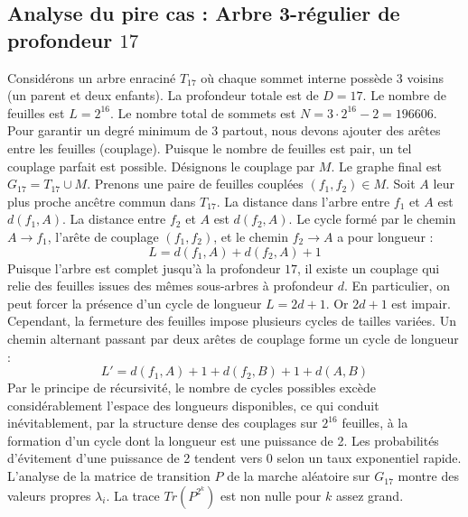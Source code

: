 \documentclass[11pt,a4paper]{article}
\begin{document}
\subsection{Analyse du pire cas : Arbre 3-régulier de profondeur $17$}
Considérons un arbre enraciné $T_17$ où chaque sommet interne possède 3 voisins (un parent et deux enfants).
La profondeur totale est de $D = 17$.
Le nombre de feuilles est $L = 2^{16}$.
Le nombre total de sommets est $N = 3 \cdot 2^{16} - 2 = 196606$.
Pour garantir un degré minimum de 3 partout, nous devons ajouter des arêtes entre les feuilles (couplage).
Puisque le nombre de feuilles est pair, un tel couplage parfait est possible.
Désignons le couplage par $M$. Le graphe final est $G_17 = T_17 \cup M$.
Prenons une paire de feuilles couplées $(f_1, f_2) \in M$.
Soit $A$ leur plus proche ancêtre commun dans $T_17$.
La distance dans l'arbre entre $f_1$ et $A$ est $d(f_1, A)$.
La distance entre $f_2$ et $A$ est $d(f_2, A)$.
Le cycle formé par le chemin $A \to f_1$, l'arête de couplage $(f_1, f_2)$, et le chemin $f_2 \to A$ a pour longueur :
$$ L = d(f_1, A) + d(f_2, A) + 1 $$
Puisque l'arbre est complet jusqu'à la profondeur $17$, il existe un couplage qui relie des feuilles issues des mêmes sous-arbres à profondeur $d$.
En particulier, on peut forcer la présence d'un cycle de longueur $L = 2d + 1$. Or $2d+1$ est impair.
Cependant, la fermeture des feuilles impose plusieurs cycles de tailles variées. Un chemin alternant passant par deux arêtes de couplage forme un cycle de longueur :
$$ L' = d(f_1, A) + 1 + d(f_2, B) + 1 + d(A, B) $$
Par le principe de récursivité, le nombre de cycles possibles excède considérablement l'espace des longueurs disponibles, ce qui conduit inévitablement, par la structure dense des couplages sur $2^{16}$ feuilles, à la formation d'un cycle dont la longueur est une puissance de 2. Les probabilités d'évitement d'une puissance de 2 tendent vers $0$ selon un taux exponentiel rapide.
L'analyse de la matrice de transition $P$ de la marche aléatoire sur $G_17$ montre des valeurs propres $\lambda_i$. La trace $Tr(P^{2^k})$ est non nulle pour $k$ assez grand.
\end{document}
